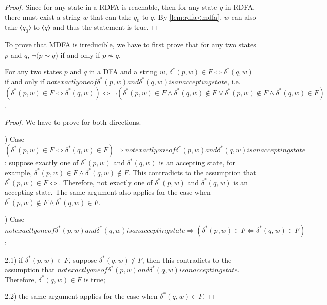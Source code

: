 \begin{proof}
\noindent Since for any state in a RDFA is reachable, then for any
state \(q\) in RDFA, there must
exist a string \(w\) that can take \(q_0\) to \(q\). By
\autoref{lem:rdfa<mdfa}, \(w\) can also take \(\llangle q_0
\rrangle\) to \(\llangle q \rrangle\) and thus the statement is true. 
\end{proof}

\par To prove that MDFA is irreducible, we have to first prove
that for any two states \(p\) and \(q\), \(\neg (p \sim q\)) if and only if
\(p \nsim q\). 

\begin{lem}
\label{lem:sim_nsim1}
\noindent For any two states \(p\) and \(q\) in a DFA and a string
\(w\), \(\delta^*(p,w) \in F \Leftrightarrow \delta^*(q,w)\) if and
only if \(not exactly one of \delta^*(p,w) and \delta^*(q,w) is
an accepting state\), i.e. \((\delta^*(p,w) \in F \Leftrightarrow
\delta^*(q,w)) \Leftrightarrow \neg (\delta^*(p,w) \in F \wedge \delta^*(q,w) \notin F \vee
\delta^*(p,w) \notin F \wedge \delta^*(q,w) \in F)\). 
\end{lem}

\begin{proof}
\noindent We have to prove for both directions. 

\par {}) Case \((\delta^*(p,w) \in F \Leftrightarrow
\delta^*(q,w) \in F) \Rightarrow not
exactly one of \delta^*(p,w) and \delta^*(q,w) is
an accepting state\): suppose exactly one of \(\delta^*(p,w)\) and
\(\delta^*(q,w)\) is an accepting state, for example, \(\delta^*(p,w)
\in F \wedge \delta^*(q,w) \notin F\). This contradicts to the
assumption that \(\delta^*(p,w) \in F \Leftrightarrow\). Therefore, not
exactly one of \(\delta^*(p,w)\) and \(\delta^*(q,w)\) is
an accepting state. The same argument also applies for the case when \(\delta^*(p,w)
\notin F \wedge \delta^*(q,w) \in F\).

\par {}) Case \(not
exactly one of \delta^*(p,w) and \delta^*(q,w) is
an accepting state \Rightarrow (\delta^*(p,w) \in F \Leftrightarrow
\delta^*(q,w) \in F)\): 
\par 2.1) if \(\delta^*(p,w) \in F\), suppose \(\delta^*(q,w) \notin
F\), then this contradicts to the assumption that \(not
exactly one of \delta^*(p,w) and \delta^*(q,w) is
an accepting state\). Therefore, \(\delta^*(q,w) \in F\) is true;
\par 2.2) the same argument applies for the case when \(\delta^*(q,w) \in F\).
\end{proof}



